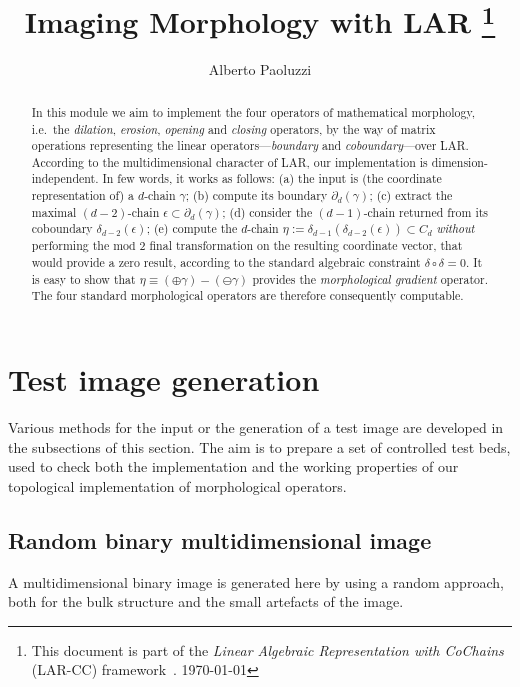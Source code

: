 \documentclass[11pt,oneside]{article}	%
\title{Imaging Morphology with LAR
\footnote{This document is part of the \emph{Linear Algebraic Representation with CoChains} (LAR-CC) framework~\cite{cclar-proj:2013:00}. \today}
}
\author{Alberto Paoluzzi}
\begin{document}
\maketitle
\nonstopmode

\begin{abstract}
In this module we aim to implement the four operators of mathematical morphology, i.e.~the \emph{dilation}, \emph{erosion}, \emph{opening} and \emph{closing} operators, by the way of matrix operations representing the linear operators---\emph{boundary} and \emph{coboundary}---over LAR. 
According to the multidimensional character of LAR, our implementation is dimension-independent.
In few words, it works as follows: (a)  the input is (the coordinate representation of) a $d$-chain $\gamma$; (b) compute its boundary $\partial_d(\gamma)$; (c) extract the maximal $(d-2)$-chain $\epsilon \subset \partial_d(\gamma)$; (d) consider the $(d-1)$-chain returned from its coboundary $\delta_{d-2}(\epsilon)$; (e) compute the $d$-chain $\eta := \delta_{d-1}(\delta_{d-2}(\epsilon)) \subset C_d$ \emph{without} performing the  $\mbox{mod\ 2}$ final transformation on the resulting coordinate vector, that would provide a zero result, according to the standard algebraic constraint $\delta\circ\delta=0$. It is easy to show that $\eta \equiv (\oplus \gamma) - (\ominus \gamma)$ provides the \emph{morphological gradient} operator. The four standard morphological operators are therefore  consequently computable.
\end{abstract}

\tableofcontents

\section{Test image generation}

Various methods for the input or the generation of a test image  are developed in the subsections of this section. The aim is to prepare a set of controlled test beds, used to check both the implementation and the working properties of our topological implementation of morphological operators. 


\subsection{Random binary multidimensional image}

A multidimensional binary image is generated here by using a random approach, both for the bulk structure and the small artefacts of the image.  
\end{document}
